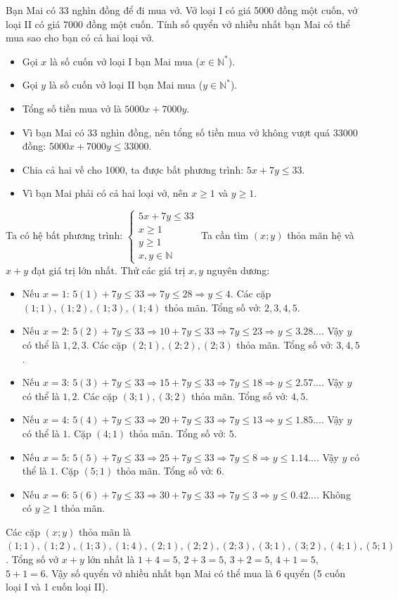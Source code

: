 \begin{emcothe}
Bạn Mai có 33 nghìn đồng để đi mua vở. Vở loại I có giá 5000 đồng một cuốn, vở loại II có giá 7000 đồng một cuốn. Tính số quyển vở nhiều nhất bạn Mai có thể mua sao cho bạn có cả hai loại vở.
\begin{itemize}
    \item Gọi $x$ là số cuốn vở loại I bạn Mai mua ($x \in \mathbb{N}^*$).
    \item Gọi $y$ là số cuốn vở loại II bạn Mai mua ($y \in \mathbb{N}^*$).
    \item Tổng số tiền mua vở là $5000x + 7000y$.
    \item Vì bạn Mai có 33 nghìn đồng, nên tổng số tiền mua vở không vượt quá 33000 đồng: $5000x + 7000y \le 33000$.
    \item Chia cả hai vế cho 1000, ta được bất phương trình: $5x + 7y \le 33$.
    \item Vì bạn Mai phải có cả hai loại vở, nên $x \ge 1$ và $y \ge 1$.
\end{itemize}
Ta có hệ bất phương trình:
$\begin{cases}
    5x + 7y \le 33 \\
    x \ge 1 \\
    y \ge 1 \\
    x, y \in \mathbb{N}
\end{cases}$
Ta cần tìm $(x; y)$ thỏa mãn hệ và $x+y$ đạt giá trị lớn nhất.
Thử các giá trị $x, y$ nguyên dương:
\begin{itemize}
    \item Nếu $x=1$: $5(1) + 7y \le 33 \Rightarrow 7y \le 28 \Rightarrow y \le 4$. Các cặp $(1;1), (1;2), (1;3), (1;4)$ thỏa mãn. Tổng số vở: $2, 3, 4, 5$.
    \item Nếu $x=2$: $5(2) + 7y \le 33 \Rightarrow 10 + 7y \le 33 \Rightarrow 7y \le 23 \Rightarrow y \le 3.28...$. Vậy $y$ có thể là $1, 2, 3$. Các cặp $(2;1), (2;2), (2;3)$ thỏa mãn. Tổng số vở: $3, 4, 5$.
    \item Nếu $x=3$: $5(3) + 7y \le 33 \Rightarrow 15 + 7y \le 33 \Rightarrow 7y \le 18 \Rightarrow y \le 2.57...$. Vậy $y$ có thể là $1, 2$. Các cặp $(3;1), (3;2)$ thỏa mãn. Tổng số vở: $4, 5$.
    \item Nếu $x=4$: $5(4) + 7y \le 33 \Rightarrow 20 + 7y \le 33 \Rightarrow 7y \le 13 \Rightarrow y \le 1.85...$. Vậy $y$ có thể là $1$. Cặp $(4;1)$ thỏa mãn. Tổng số vở: $5$.
    \item Nếu $x=5$: $5(5) + 7y \le 33 \Rightarrow 25 + 7y \le 33 \Rightarrow 7y \le 8 \Rightarrow y \le 1.14...$. Vậy $y$ có thể là $1$. Cặp $(5;1)$ thỏa mãn. Tổng số vở: $6$.
    \item Nếu $x=6$: $5(6) + 7y \le 33 \Rightarrow 30 + 7y \le 33 \Rightarrow 7y \le 3 \Rightarrow y \le 0.42...$. Không có $y \ge 1$ thỏa mãn.
\end{itemize}
Các cặp $(x;y)$ thỏa mãn là $(1;1), (1;2), (1;3), (1;4), (2;1), (2;2), (2;3), (3;1), (3;2), (4;1), (5;1)$.
Tổng số vở $x+y$ lớn nhất là $1+4=5$, $2+3=5$, $3+2=5$, $4+1=5$, $5+1=6$.
Vậy số quyển vở nhiều nhất bạn Mai có thể mua là 6 quyển (5 cuốn loại I và 1 cuốn loại II).
\end{emcothe}

